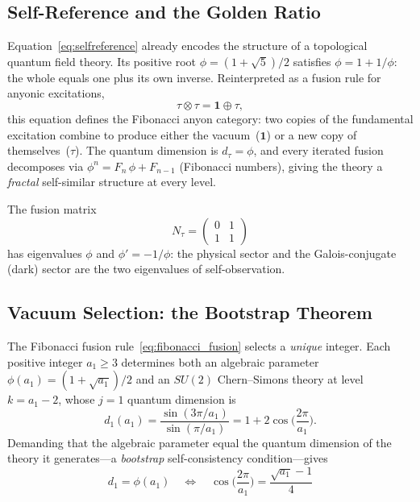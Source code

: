 \documentclass[12pt,a4paper]{article}
\theoremstyle{definition}
\begin{document}
\subsection{Self-Reference and the Golden Ratio}

Equation~\eqref{eq:selfreference} already encodes the structure of a topological quantum field theory.  Its positive root $\phi = (1 + \sqrt{5})/2$ satisfies $\phi = 1 + 1/\phi$: the whole equals one plus its own inverse.  Reinterpreted as a fusion rule for anyonic excitations,
\begin{equation}
\tau \otimes \tau = \mathbf{1} \oplus \tau,
\label{eq:fibonacci_fusion}
\end{equation}
this equation defines the Fibonacci anyon category: two copies of the fundamental excitation combine to produce either the vacuum~($\mathbf{1}$) or a new copy of themselves~($\tau$).  The quantum dimension is $d_\tau = \phi$, and every iterated fusion decomposes via $\phi^n = F_n\,\phi + F_{n-1}$ (Fibonacci numbers), giving the theory a \emph{fractal} self-similar structure at every level.

The fusion matrix
\[
N_\tau = \begin{pmatrix} 0 & 1 \\ 1 & 1 \end{pmatrix}
\]
has eigenvalues $\phi$ and $\phi' = -1/\phi$: the physical sector and the Galois-conjugate (dark) sector are the two eigenvalues of self-observation.

\subsection{Vacuum Selection: the Bootstrap Theorem}
\label{sec:bootstrap}

The Fibonacci fusion rule~\eqref{eq:fibonacci_fusion} selects a \emph{unique} integer.  Each positive integer $a_1 \ge 3$ determines both an algebraic parameter $\phi(a_1) = (1 + \sqrt{a_1})/2$ and an $SU(2)$ Chern--Simons theory at level $k = a_1 - 2$, whose $j = 1$ quantum dimension is
\begin{equation}
d_1(a_1) = \frac{\sin(3\pi/a_1)}{\sin(\pi/a_1)} = 1 + 2\cos\!\Big(\frac{2\pi}{a_1}\Big).
\end{equation}
Demanding that the algebraic parameter equal the quantum dimension of the theory it generates---a \emph{bootstrap} self-consistency condition---gives
\begin{equation}
\label{eq:bootstrap}
\boxed{d_1 = \phi(a_1) \quad\Longleftrightarrow\quad \cos\!\Big(\frac{2\pi}{a_1}\Big) = \frac{\sqrt{a_1} - 1}{4}}
\end{equation}
\end{document}
